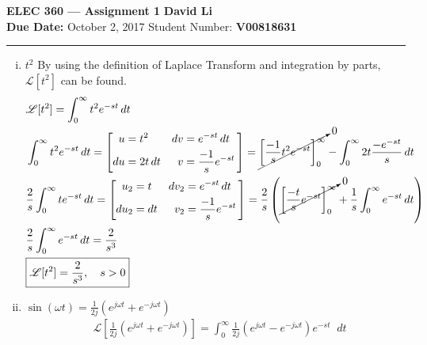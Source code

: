 \documentclass[12pt]{article}
\newenvironment{problem}[2][Problem]{\begin{trivlist}
		\item[\hskip \labelsep {\bfseries #1}\hskip \labelsep {\bfseries #2.}]}{\end{trivlist}}
\newcommand\diff{\mathop{}\!d}
\begin{document}
\noindent \textbf{ELEC 360 --- Assignment 1} \hfill \textbf{David Li} \\
\textbf{Due Date:} October 2, 2017 \hfill Student Number: \textbf{V00818631} \\
\vspace{-0.9cm}
\hrule
\vspace{1cm}
\begin{problem}{1 (A) --- Laplace Transforms} \hfill
	\begin{enumerate}[i)]
		\item $t^2$ \newline
		By using the definition of Laplace Transform and integration by parts, $\mathscr{L}[t^2]$ can be found.
		\begin{align*}
		& \mathscr{L}[t^2] = \int_{0}^{\infty} t^2 e^{-st} \diff t \\
		& \int_{0}^{\infty} t^2 e^{-st} \diff t =
		\left[
		\begin{alignedat}{2}  %
		u       &= t^2             \quad & \diff v &= e^{-st} \diff t \\
		\diff u &= 2t \diff t \quad & v &= \frac{-1}{s}e^{-st}
		\end{alignedat}\,
		\right]
		= \cancelto{0}{\left[
		\frac{-1}{s}t^2e^{-st}
		\right]^{\infty}_{0}}
		- \int_{0}^{\infty}2t\frac{-e^{-st}}{s} \diff t \\
		 &\frac{2}{s}\int_{0}^{\infty}t e^{-st} \diff t 
		  =
		 	\left[
		 \begin{alignedat}{2}
		 u_2       &= t             \quad & \diff v_2 &= e^{-st} \diff t \\
		 \diff u_2 &= \diff t \quad & v_2 &= \frac{-1}{s}e^{-st} 
		 \end{alignedat}\,
		 \right] = \frac{2}{s}\left(
		 \cancelto{0}{\left[
		 	\frac{-t}{s}e^{-st}
		 	\right]^{\infty}_{0}} %
		 +
		 \frac{1}{s}\int_{0}^{\infty}e^{-st} \diff t \right) \\
		 & \frac{2}{s} \int_{0}^{\infty}e^{-st} \diff t = \frac{2}{s^3} \\
		 & \boxed{\mathscr{L}[t^2]  = \frac{2}{s^3}, \quad s > 0}
		\end{align*}
		\item $\sin(\omega t) = \frac{1}{2j}\left( e^{j\omega t}+ e^{-j\omega t}\right)$
		\begin{align*}
		& \mathscr{L} \left[\frac{1}{2j}\left( e^{j\omega t}+ e^{-j\omega t}\right)\right] = \int_{0}^{\infty} \frac{1}{2j}\left( e^{j\omega t}- e^{-j\omega t}\right) e^{-st} \diff t \\

\end{align*}
\end{enumerate}
\end{problem}
\end{document}
